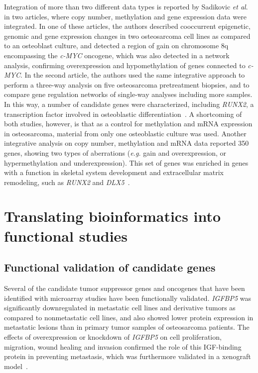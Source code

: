 Integration of more than two different data types is
reported by Sadikovic {\it et al}.~\cite{sadikovic2008vitro} in two articles, where copy
number, methylation and gene expression data were integrated.
In one of these articles, the authors described cooccurrent
epigenetic, genomic and gene expression changes
in two osteosarcoma cell lines as compared to an osteoblast
culture, and detected a region of gain on chromosome 8q
encompassing the {\it c-MYC} oncogene, which was also detected
in a network analysis, confirming overexpression and hypomethylation
of genes connected to {\it c-MYC}. In the second article,
the authors used the same integrative approach to
perform a three\hyp{}way analysis on five osteosarcoma pretreatment
biopsies, and to compare gene regulation networks of
single\hyp{}way analyses including more samples. In this way, a
number of candidate genes were characterized, including
{\it RUNX2}, a transcription factor involved in osteoblastic differentiation~\cite{sadikovic2009identification}. A
shortcoming of both studies, however, is that
as a control for methylation and mRNA expression in
osteosarcoma, material from only one osteoblastic culture
was used. Another integrative analysis on copy number,
methylation and mRNA data reported 350 genes, showing
two types of aberrations ({\it e.g.} gain and overexpression, or hypermethylation
and underexpression). This set of genes was
enriched in genes with a function in skeletal system development
and extracellular matrix remodeling, such as {\it RUNX2}
and {\it DLX5}~\cite{kresse2012integrative}.

%
\section{Translating bioinformatics into functional studies}\label{translating2}
\subsection{Functional validation of candidate genes}
Several of the candidate tumor suppressor genes and oncogenes
that have been identified with microarray studies have
been functionally validated. {\it IGFBP5} was significantly downregulated
in metastatic cell lines and derivative tumors as compared
to nonmetastatic cell lines, and also showed lower
protein expression in metastatic lesions than in primary tumor
samples of osteosarcoma patients. The effects of overexpression
or knockdown of {\it IGFBP5} on cell proliferation,
migration, wound healing and invasion confirmed the role of
this IGF\hyp{}binding protein in preventing metastasis, which was
furthermore validated in a xenograft model~\cite{su2011insulin}.

